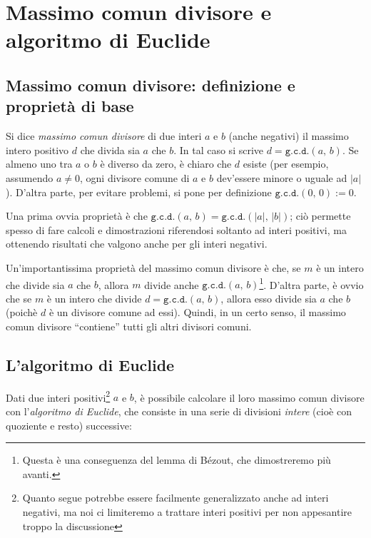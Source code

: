\documentclass[pdflatex,11pt,a4paper,oneside]{article}
\newcommand{\abs}[1]{\left|{#1}\right|}
\newcommand{\gcdop}[0]{\ensuremath{\mathtt{g.c.d.}}}
\newcommand{\xgcd}[1]{\ensuremath{\gcdop\left({#1}\right)}}
\renewcommand{\gcd}[2]{\xgcd{{#1},\,{#2}}}
\begin{document}

\section{Massimo comun divisore e algoritmo di Euclide}


\subsection{Massimo comun divisore: definizione e propriet\`a di base}

Si dice \emph{massimo comun divisore} di due interi $a$ e $b$ (anche
negativi) il massimo intero positivo $d$ che divida sia $a$ che $b$.
In tal caso si scrive $d = \gcd{a}{b}$.  Se almeno uno tra $a$ o $b$
\`e diverso da zero, \`e chiaro che $d$ esiste (per esempio, assumendo
$a \neq 0$, ogni divisore comune di $a$ e $b$ dev'essere minore o
uguale ad $\abs{a}$).  D'altra parte, per evitare problemi, si pone
per definizione $\gcd{0}{0} := 0$.

Una prima ovvia propriet\`a \`e che $\gcd{a}{b} = \gcd{\abs{a}}{\abs{b}}$;
ci\`o permette spesso di fare calcoli e dimostrazioni riferendosi soltanto
ad interi positivi, ma ottenendo risultati che valgono anche per gli
interi negativi.

Un'importantissima propriet\`a del massimo comun divisore \`e che, se
$m$ \`e un intero che divide sia $a$ che $b$, allora $m$ divide anche
$\gcd{a}{b}$\footnote{Questa \`e una conseguenza del lemma di B\'ezout,
che dimostreremo pi\`u avanti.}. D'altra parte, \`e ovvio che se $m$ \`e 
un intero che divide $d = \gcd{a}{b}$, allora esso divide sia $a$ che $b$
(poich\`e $d$ \`e un divisore comune ad essi).  Quindi, in un certo senso,
il massimo comun divisore ``contiene'' tutti gli altri divisori comuni.


\subsection{L'algoritmo di Euclide}

Dati due interi positivi\footnote{Quanto segue potrebbe essere facilmente
generalizzato anche ad interi negativi, ma noi ci limiteremo a trattare
interi positivi per non appesantire troppo la discussione} $a$ e $b$,
\`e possibile calcolare il loro massimo comun divisore con
l'\emph{algoritmo di Euclide}, che consiste in una serie di divisioni
\emph{intere} (cio\`e con quoziente e resto) successive:
\end{document}
